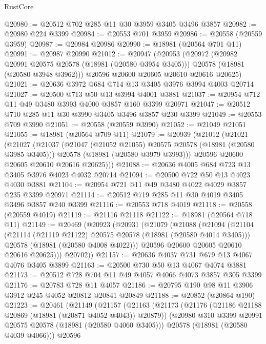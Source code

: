 \begin{lexlean}{RustCore}
\begin{coremodule}
@20980 := @20512 @702 @285 @11 @30 @3959 @3405 @3496 @3857
@20982 := @20980 @224 @3399
@20984 := @20553 @701 @3959
@20986 := @20558 (@20559 @3959)
@20987 := @20984 @20986
@20990 := @18981 (@20564 @701 @11)
@20991 := @20987 @20990
@21012 := @20947
    (@20953
      (@20972
        (@20982 @20991 @20575 @20578 (@18981 (@20580 @3954 @3405)))
        @20578
        (@18981 (@20580 @3948 @3962)))
      @20596
      @20600
      @20605
      @20610
      @20616
      @20625)
@21021 := @20636 @3972 @684 @714 @13 @3405 @3976 @3994 @4003 @20714
@21027 := @20500 @713 @50 @13 @3994 @4001 @3881
@21037 := @20954 @712 @11 @49 @3480 @3993 @4000 @3857 @160 @3399 @20971
@21047 := @20512 @710 @285 @11 @30 @3990 @3405 @3496 @3857 @230 @3399
@21049 := @20553 @709 @3990
@21051 := @20558 (@20559 @3990)
@21052 := @21049 @21051
@21055 := @18981 (@20564 @709 @11)
@21079 := @20939
    (@21012
      (@21021
        (@21027
          (@21037
            (@21047 (@21052 @21055) @20575 @20578 (@18981 (@20580 @3985 @3405)))
            @20578
            (@18981 (@20580 @3979 @3993)))
          @20596
          @20600
          @20605
          @20610
          @20616
          @20625)))
@21088 := @20636 @4005 @684 @723 @13 @3405 @3976 @4023 @4032 @20714
@21094 := @20500 @722 @50 @13 @4023 @4030 @3881
@21104 := @20954 @721 @11 @49 @3480 @4022 @4029 @3857 @235 @3399 @20971
@21114 := @20512 @719 @285 @11 @30 @4019 @3405 @3496 @3857 @240 @3399
@21116 := @20553 @718 @4019
@21118 := @20558 (@20559 @4019)
@21119 := @21116 @21118
@21122 := @18981 (@20564 @718 @11)
@21149 := @20469
    (@20923
      (@20931
        (@21079
          (@21088
            (@21094
              (@21104
                (@21114 (@21119 @21122) @20575 @20578 (@18981 (@20580 @4014 @3405)))
                @20578
                (@18981 (@20580 @4008 @4022)))
              @20596
              @20600
              @20605
              @20610
              @20616
              @20625)))
        @20702))
@21157 := @20636 @4037 @731 @679 @13 @4067 @4076 @3405 @3899
@21163 := @20500 @730 @50 @13 @4067 @4074 @3881
@21173 := @20512 @728 @704 @11 @49 @4057 @4066 @4073 @3857 @305 @3399
@21176 := @20783 @728 @11 @4057
@21186 := @20795 @190 @98 @11 @3906 @3912 @245 @4052 @20812 @20841 @20849
@21188 := @20852 (@20864 @190)
@21223 := @20461
    (@21149
      (@21157
        (@21163
          (@21173
            (@21176 (@21186 @21188 @20869 (@18981 (@20871 @4052 @4043)) @20879))
            (@20980 @310 @3399 @20991 @20575 @20578 (@18981 (@20580 @4060 @3405)))
            @20578
            (@18981 (@20580 @4039 @4066)))
          @20596

\end{coremodule}
\end{lexlean}

